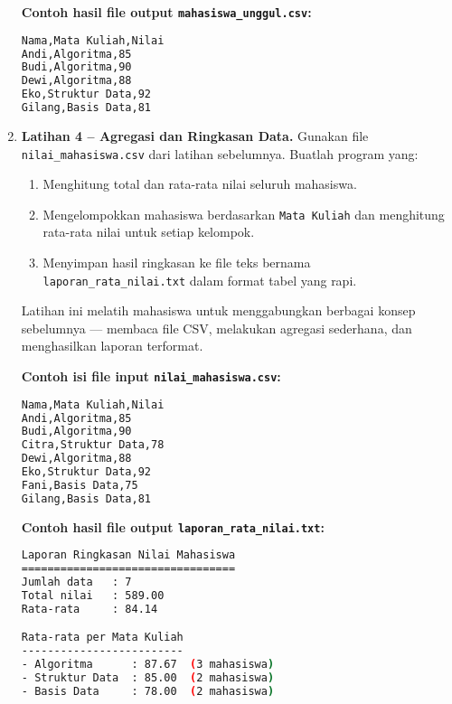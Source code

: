 \begin{enumerate}
\noindent\textbf{Contoh hasil file output \texttt{mahasiswa\_unggul.csv}:}

\begin{lstlisting}[language=bash, caption={Isi file mahasiswa_unggul.csv yang dihasilkan}]
Nama,Mata Kuliah,Nilai
Andi,Algoritma,85
Budi,Algoritma,90
Dewi,Algoritma,88
Eko,Struktur Data,92
Gilang,Basis Data,81
\end{lstlisting}


    \item \textbf{Latihan 4 – Agregasi dan Ringkasan Data.}  
Gunakan file \texttt{nilai\_mahasiswa.csv} dari latihan sebelumnya.  
Buatlah program yang:
\begin{enumerate}
    \item Menghitung total dan rata-rata nilai seluruh mahasiswa.  
    \item Mengelompokkan mahasiswa berdasarkan \texttt{Mata Kuliah} dan menghitung rata-rata nilai untuk setiap kelompok.  
    \item Menyimpan hasil ringkasan ke file teks bernama \texttt{laporan\_rata\_nilai.txt} dalam format tabel yang rapi.  
\end{enumerate}
Latihan ini melatih mahasiswa untuk menggabungkan berbagai konsep sebelumnya — membaca file CSV, melakukan agregasi sederhana, dan menghasilkan laporan terformat.

\noindent\textbf{Contoh isi file input \texttt{nilai\_mahasiswa.csv}:}

\begin{lstlisting}[language=bash, caption={Cuplikan isi file nilai_mahasiswa.csv}]
Nama,Mata Kuliah,Nilai
Andi,Algoritma,85
Budi,Algoritma,90
Citra,Struktur Data,78
Dewi,Algoritma,88
Eko,Struktur Data,92
Fani,Basis Data,75
Gilang,Basis Data,81
\end{lstlisting}

\noindent\textbf{Contoh hasil file output \texttt{laporan\_rata\_nilai.txt}:}

\begin{lstlisting}[language=bash, caption={Isi file laporan_rata_nilai.txt yang dihasilkan}]
Laporan Ringkasan Nilai Mahasiswa
=================================
Jumlah data   : 7
Total nilai   : 589.00
Rata-rata     : 84.14

Rata-rata per Mata Kuliah
-------------------------
- Algoritma      : 87.67  (3 mahasiswa)
- Struktur Data  : 85.00  (2 mahasiswa)
- Basis Data     : 78.00  (2 mahasiswa)
\end{lstlisting}

\end{enumerate}

